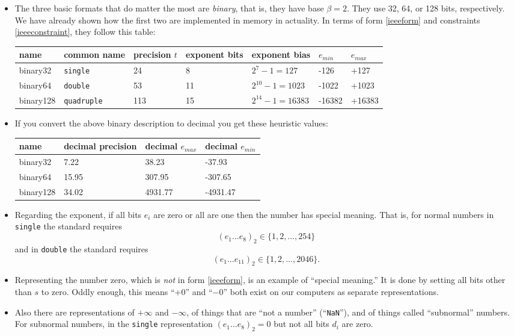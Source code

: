 \documentclass[11pt]{amsart}
\begin{document}
\begin{itemize}
\item The three basic formats that do matter the most are \emph{binary}, that is, they have base $\beta=2$.  They use 32, 64, or 128 bits, respectively.  We have already shown how the first two are implemented in memory in actuality.  In terms of form \eqref{ieeeform} and constraints \eqref{ieeeconstraint}, they follow this table:

\bigskip
\small
\begin{tabular}{lllllll}
name     & common name & precision $t$ & exponent bits & exponent bias & $e_{min}$ & $e_{max}$ \\ \hline
binary32 &    \texttt{single} & 24 &  8 &     $2^7-1=127$ &  -126 &  +127 \\
binary64 &    \texttt{double} & 53 & 11 & $2^{10}-1=1023$ & -1022 & +1023 \\
binary128 &\texttt{quadruple} &113 & 15 &$2^{14}-1=16383$ &-16382 &+16383
\end{tabular}
\normalsize
\medskip

\item If you convert the above binary description to decimal you get these heuristic values:

\bigskip
\small
\begin{tabular}{llll}
name & decimal precision & decimal $e_{max}$ & decimal $e_{min}$ \\ \hline
binary32 & 7.22 & 38.23 & -37.93 \\
binary64 & 15.95 & 307.95 & -307.65 \\
binary128 & 34.02 & 4931.77 & -4931.47
\end{tabular}
\normalsize
\medskip

\item Regarding the exponent, if all bits $e_i$ are zero or all are one then the number has special meaning.  That is, for normal numbers in \texttt{single} the standard requires
   $$\left(e_1\dots e_8\right)_2 \in \{1,2,\dots,254\}$$
and in \texttt{double} the standard requires
   $$\left(e_1\dots e_{11}\right)_2 \in \{1,2,\dots,2046\}.$$

\item Representing the number zero, which  is \emph{not} in form \eqref{ieeeform}, is an example of ``special meaning.''  It is done by setting all bits other than $s$ to zero.  Oddly enough, this means ``$+0$'' and ``$-0$'' both exist on our computers as separate representations.

\item Also there are representations of $+\infty$ and $-\infty$, of things that are ``not a number'' (``\texttt{NaN}''), and of things called ``subnormal'' numbers.  For subnormal numbers, in the \texttt{single} representation $\left(e_1\dots e_8\right)_2 = 0$ but not all bits $d_i$ are zero.


\end{itemize}
\end{document}
